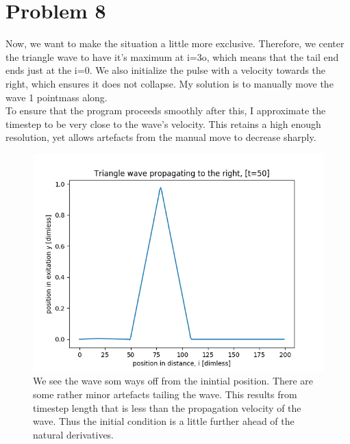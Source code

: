 \documentclass[12pt]{article}
\begin{document}
\section*{Problem 8}
	Now, we want to make the situation a little more exclusive. Therefore, we center the triangle wave to have it's maximum at i=3o, which means that the tail end ends just at the i=0. We also initialize the pulse with a velocity towards the right, which ensures it does not collapse. My solution is to manually move the wave 1 pointmass along. \\
	To ensure that the program proceeds smoothly after this, I approximate the timestep to be very close to the wave's velocity. This retains a high enough resolution, yet allows artefacts from the manual move to decrease sharply. 

\begin{figure}[H]
	\includegraphics[scale=0.7]{TriangleWave_velocityRight}
	\caption{We see the wave som ways off from the inintial position. There are some rather minor artefacts tailing the wave. This results from timestep length that is less than the propagation velocity of the wave. Thus the initial condition is a little further ahead of the natural derivatives. }
\end{figure}	
	
\end{document}
